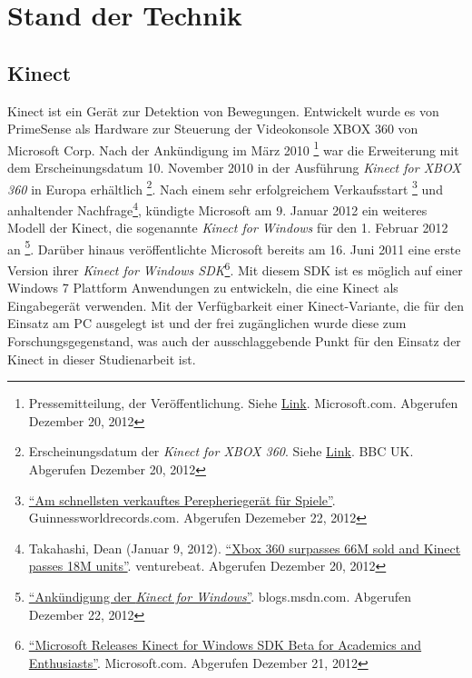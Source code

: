 \chapter{Stand der Technik}
\label{chap:Stand der Technik}

\section{Kinect}
Kinect ist ein Ger\"at zur Detektion von Bewegungen. Entwickelt wurde es von PrimeSense als Hardware zur Steuerung der Videokonsole 
XBOX 360 von Microsoft Corp. Nach der Ank\"undigung im M\"arz 2010 \footnote{Pressemitteilung, der Ver\"offentlichung. Siehe \href{https://www.microsoft.com/en-us/news/press/2010/mar10/03-31PrimeSensePR.aspx}{Link}. Microsoft.com.  Abgerufen Dezember 20, 2012}
war die Erweiterung mit dem Erscheinungsdatum 10. November 2010 in der Ausf\"uhrung \textit{Kinect for XBOX 360} in Europa erh\"altlich \footnote{Erscheinungsdatum der \textit{Kinect for XBOX 360}. Siehe \href{http://www.bbc.co.uk/newsbeat/10996389}{Link}. BBC UK. Abgerufen Dezember 20, 2012}.
Nach einem sehr erfolgreichem Verkaufsstart \footnote{\href{http://www.guinnessworldrecords.com/records-9000/fastest-selling-gaming-peripheral/}{\enquote{Am schnellsten verkauftes Perepherieger\"at f\"ur Spiele}}. Guinnessworldrecords.com. Abgerufen Dezemeber 22, 2012}
und anhaltender Nachfrage\footnote{Takahashi, Dean (Januar 9, 2012). \href{http://venturebeat.com/2012/01/09/xbox-360-surpassed-66m-sold-and-kinect-has-sold-18m-units/}{\enquote{Xbox 360 surpasses 66M sold and Kinect passes 18M units}}. venturebeat. Abgerufen Dezember 20, 2012},
k\"undigte Microsoft am 9. Januar 2012 ein weiteres Modell der Kinect, die sogenannte \textit{Kinect for Windows} f\"ur den 1. Februar 2012 an \footnote{\href{https://blogs.msdn.com/b/kinectforwindows/archive/2012/01/09/kinect-for-windows-commercial-program-announced.aspx?Redirected=true}{\enquote{Ank\"undigung der \textit{Kinect for Windows}}}. blogs.msdn.com. Abgerufen Dezember 22, 2012}.
\newline
Dar\"uber hinaus ver\"offentlichte Microsoft bereits am 16. Juni 2011 eine erste Version ihrer \textit{Kinect for Windows SDK}\footnote{\href{https://www.microsoft.com/en-us/news/press/2011/jun11/06-16MSKinectSDKPR.aspx}{\enquote{Microsoft Releases Kinect for Windows SDK Beta for Academics and Enthusiasts}}. Microsoft.com. Abgerufen Dezember 21, 2012}.
Mit diesem \gls{SDK} ist es m\"oglich auf einer Windows 7 Plattform Anwendungen zu entwickeln, die eine Kinect als Eingabeger\"at verwenden.
\newline
Mit der Verf\"ugbarkeit einer Kinect-Variante, die f\"ur den Einsatz am PC ausgelegt ist und der frei zug\"anglichen  wurde diese zum Forschungsgegenstand, was auch der ausschlaggebende Punkt f\"ur den Einsatz der Kinect in dieser Studienarbeit ist.
